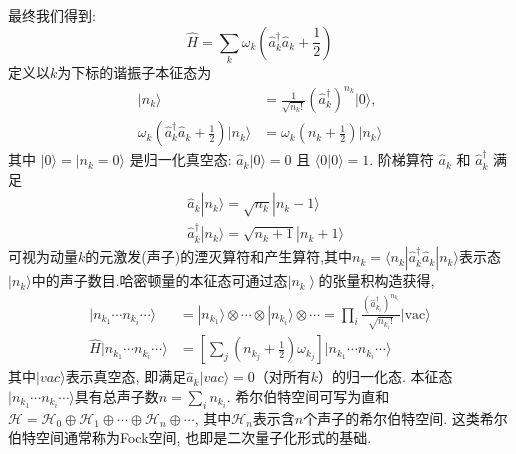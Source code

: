 最终我们得到:
\begin{equation}
    \hat{H}=\sum_k\omega_k\left(\hat{a}_k^\dagger\hat{a}_k+\frac{1}{2}\right)
\end{equation}
定义以$ k $为下标的谐振子本征态为
\begin{equation}
    \begin{aligned}|n_k\rangle&=\frac{1}{\sqrt{n_k!}}\left(\hat{a}_k^\dagger\right)^{n_k}|0\rangle,\\\omega_k\left(\hat{a}_k^\dagger\hat{a}_k+\frac{1}{2}\right)|n_k\rangle&=\omega_k\left(n_k+\frac{1}{2}\right)|n_k\rangle\end{aligned}
\end{equation}
其中 $|0\rangle=|n_k=0\rangle$ 是归一化真空态: $\hat{a}_k|0\rangle=0$ 且 $\langle0|0\rangle=1$. 阶梯算符 $\hat{a}_k$ 和 $\hat{a}_k^\dagger$ 满足
\begin{equation}
    \begin{aligned}&\hat{a}_k|n_k\rangle=\sqrt{n_k}|n_k-1\rangle\\&\hat{a}_k^\dagger|n_k\rangle=\sqrt{n_k+1}|n_k+1\rangle\end{aligned}
\end{equation}
可视为动量$k$的元激发(声子)的湮灭算符和产生算符,其中$n_k=\langle n_k|\hat{a}_k^\dagger\hat{a}_k|n_k\rangle$表示态$|n_k\rangle$中的声子数目.哈密顿量的本征态可通过态$\left|n_k\right\rangle$的张量积构造获得,
\begin{equation}
    \begin{aligned}|n_{k_1}\cdots n_{k_i}\cdots\rangle&=|n_{k_1}\rangle\otimes\cdots\otimes|n_{k_i}\rangle\otimes\cdots=\prod_i\frac{\left(\hat{a}_{k_i}^\dagger\right)^{n_{k_i}}}{\sqrt{n_{k_i}!}}|\mathrm{vac}\rangle\\\hat{H}|n_{k_1}\cdots n_{k_i}\cdots\rangle&=\left[\sum_j\left(n_{k_j}+\frac{1}{2}\right)\omega_{k_j}\right]|n_{k_1}\cdots n_{k_i}\cdots\rangle\end{aligned}
\end{equation}
其中$|vac\rangle$表示真空态, 即满足$\hat{a}_k|vac\rangle=0$（对所有$k$）的归一化态. 本征态$|n_{k_1}\cdots n_{k_i}\cdots\rangle$具有总声子数$n=\sum_i n_{k_i}$. 希尔伯特空间可写为直和$\mathcal{H}=\mathcal{H}_0\oplus\mathcal{H}_1\oplus\cdots\oplus\mathcal{H}_n\oplus\cdots$, 其中$\mathcal{H}_n$表示含$n$个声子的希尔伯特空间. 这类希尔伯特空间通常称为Fock空间, 也即是二次量子化形式的基础.

